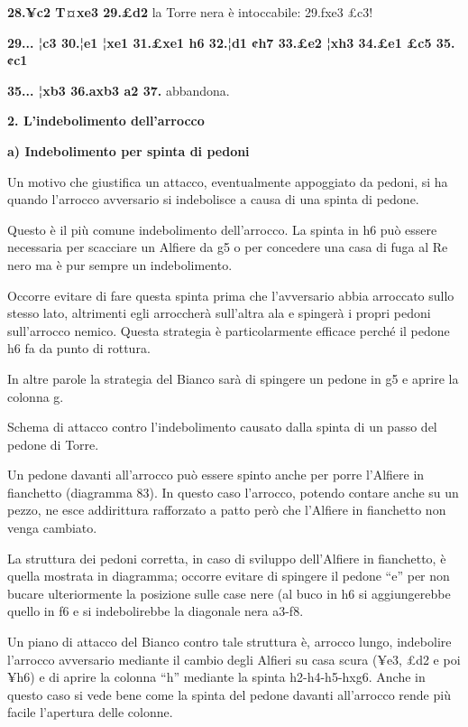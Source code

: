 \textbf{28.¥c2 T¤xe3 29.£d2} la Torre nera è intoccabile: 29.fxe3 £c3!

\textbf{29... ¦c3 30.¦e1 ¦xe1 31.£xe1 h6 32.¦d1 ¢h7 33.£e2 ¦xh3 34.£e1
£c5 35.¢c1}


\textbf{35... ¦xb3 36.axb3 a2 37.} abbandona.

\textbf{2. L'indebolimento dell'arrocco}

\textbf{a) Indebolimento per spinta di pedoni}

Un motivo che giustifica un attacco, eventualmente appoggiato da pedoni,
si ha quando l'arrocco avversario si indebolisce a causa di una spinta
di pedone.


Questo è il più comune indebolimento dell'arrocco. La spinta in h6 può
essere necessaria per scacciare un Alfiere da g5 o per concedere una
casa di fuga al Re nero ma è pur sempre un indebolimento.

Occorre evitare di fare questa spinta prima che l'avversario abbia
arroccato sullo stesso lato, altrimenti egli arroccherà sull'altra ala e
spingerà i propri pedoni sull'arrocco nemico. Questa strategia è
particolarmente efficace perché il pedone h6 fa da punto di rottura.

In altre parole la strategia del Bianco sarà di spingere un pedone in g5
e aprire la colonna g.

Schema di attacco contro l'indebolimento causato dalla spinta di un
passo del pedone di Torre.



Un pedone davanti all'arrocco può essere spinto anche per porre
l'Alfiere in fianchetto (diagramma 83). In questo caso l'arrocco,
potendo contare anche su un pezzo, ne esce addirittura rafforzato a
patto però che l'Alfiere in fianchetto non venga cambiato.

La struttura dei pedoni corretta, in caso di sviluppo dell'Alfiere in
fianchetto, è quella mostrata in diagramma; occorre evitare di spingere
il pedone ``e'' per non bucare ulteriormente la posizione sulle case
nere (al buco in h6 si aggiungerebbe quello in f6 e si indebolirebbe la
diagonale nera a3-f8.

Un piano di attacco del Bianco contro tale struttura è, arrocco lungo,
indebolire l'arrocco avversario mediante il cambio degli Alfieri su casa
scura (¥e3, £d2 e poi ¥h6) e di aprire la colonna ``h'' mediante la
spinta h2-h4-h5-hxg6. Anche in questo caso si vede bene come la spinta
del pedone davanti all'arrocco rende più facile l'apertura delle
colonne.

